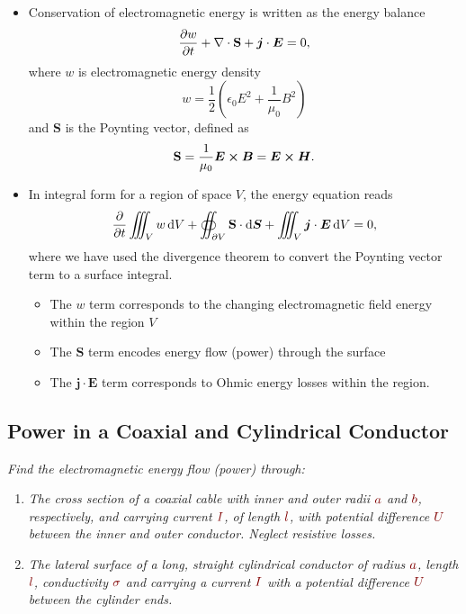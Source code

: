 \documentclass[11pt, a4paper]{article}
\newcommand{\diff}{\mathop{}\!\mathrm{d}} %
\newcommand{\dmath}[1]{\textcolor{Maroon}{#1}}  %
\renewcommand{\vec}[1]{\bm{#1}} %
\newcommand{\E}{\vec{E}}  %
\newcommand{\B}{\vec{B}}  %
\renewcommand{\H}{\vec{H}}  %
\renewcommand{\S}{\mathbf{S}}  %
\newcommand{\ee}{\epsilon_{0}}  %
\newcommand{\mm}{\mu_{0}}  %
\newcommand{\m}{\vec{m}}  %
\newcommand{\Poy}{Poynting\xspace}
\renewcommand{\div}{\nabla \cdot}
\begin{document}
\begin{itemize}
	\item Conservation of electromagnetic energy is written as the energy balance
	\begin{equation*}
		\pdv{w}{t} + \div \S + \vec{j}\cdot \E = 0,
	\end{equation*}
	where $ w $ is electromagnetic energy density
	\begin{equation*}
		w = \frac{1}{2}\left(\ee E^{2} + \frac{1}{\mm}B^{2}\right)
	\end{equation*}
	and $ \S $ is the \Poy vector, defined as
	\begin{equation*}
		\S = \frac{1}{\mm}\E \cross \B = \E \cross \H.
	\end{equation*}
	
	\item In integral form for a region of space $ V $, the energy equation reads
	\begin{equation*}
		\pdv{t}\iiint_{V}w \diff V + \oiint_{\partial V} \S \cdot  \diff \vec{S} + \iiint_{V} \vec{j}\cdot \E \diff V = 0,
	\end{equation*}
	where we have used the divergence theorem to convert the Poynting vector term to a surface integral.
	\begin{itemize}
		\item The $ w $ term corresponds to the changing electromagnetic field energy within the region $ V $
		
		\item The $ \S $ term encodes energy flow (power) through the surface
		
		\item The $ \vec{j} \cdot \E $ term corresponds to Ohmic energy losses within the region.
	\end{itemize}
	
\end{itemize}

\subsection{Power in a Coaxial and Cylindrical Conductor}
\textit{Find the electromagnetic energy flow (power) through:}
\begin{enumerate}
    \item \textit{The cross section of a coaxial cable with inner and outer radii $ \dmath{a} $ and $ \dmath{b} $, respectively, and carrying current $ \dmath{I} $, of length $ \dmath{l} $, with potential difference $ \dmath{U} $ between the inner and outer conductor. Neglect resistive losses.}
	
    \item \textit{The lateral surface of a long, straight cylindrical conductor of radius $ \dmath{a} $, length $ \dmath{l} $, conductivity $ \dmath{\sigma} $ and carrying a current $ \dmath{I} $ with a potential difference $ \dmath{U} $ between the cylinder ends.}
\end{enumerate}
\end{document}
